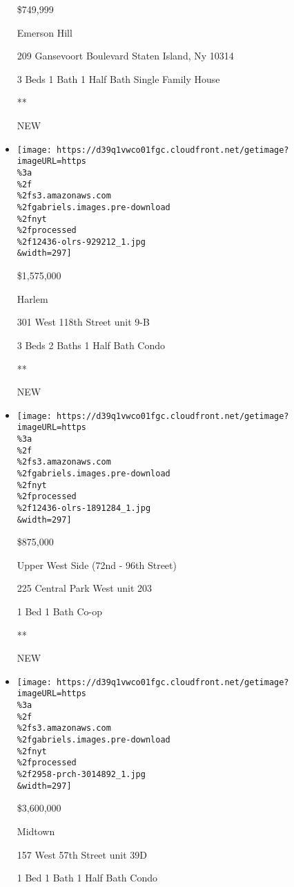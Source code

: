 \begin{itemize}
  \$749,999

  Emerson Hill

  209 Gansevoort Boulevard Staten Island, Ny 10314

  3 Beds \textbar{} 1 Bath \textbar{} 1 Half Bath \textbar{} Single
  Family House

  **

  NEW
\item
  \href{/real-estate/usa/ny/new-york/harlem/homes-for-sale/301-west-118th-street/12436-OLRS-929212?}{}

  \texttt{[image: https://d39q1vwco01fgc.cloudfront.net/getimage?imageURL=https\\\%3a\\\%2f\\\%2fs3.amazonaws.com\\\%2fgabriels.images.pre-download\\\%2fnyt\\\%2fprocessed\\\%2f12436-olrs-929212\_1.jpg\\\&width=297]}

  \$1,575,000

  Harlem

  301 West 118th Street unit 9-B

  3 Beds \textbar{} 2 Baths \textbar{} 1 Half Bath \textbar{} Condo

  **

  NEW
\item
  \href{/real-estate/usa/ny/new-york/upper-west-side-72nd---96th-street/homes-for-sale/225-central-park-west/12436-OLRS-1891284?}{}

  \texttt{[image: https://d39q1vwco01fgc.cloudfront.net/getimage?imageURL=https\\\%3a\\\%2f\\\%2fs3.amazonaws.com\\\%2fgabriels.images.pre-download\\\%2fnyt\\\%2fprocessed\\\%2f12436-olrs-1891284\_1.jpg\\\&width=297]}

  \$875,000

  Upper West Side (72nd - 96th Street)

  225 Central Park West unit 203

  1 Bed \textbar{} 1 Bath \textbar{} Co-op

  **

  NEW
\item
  \href{/real-estate/usa/ny/new-york/midtown/homes-for-sale/157-west-57th-street/2958-PRCH-3014892?}{}

  \texttt{[image: https://d39q1vwco01fgc.cloudfront.net/getimage?imageURL=https\\\%3a\\\%2f\\\%2fs3.amazonaws.com\\\%2fgabriels.images.pre-download\\\%2fnyt\\\%2fprocessed\\\%2f2958-prch-3014892\_1.jpg\\\&width=297]}

  \$3,600,000

  Midtown

  157 West 57th Street unit 39D

  1 Bed \textbar{} 1 Bath \textbar{} 1 Half Bath \textbar{} Condo


\end{itemize}
